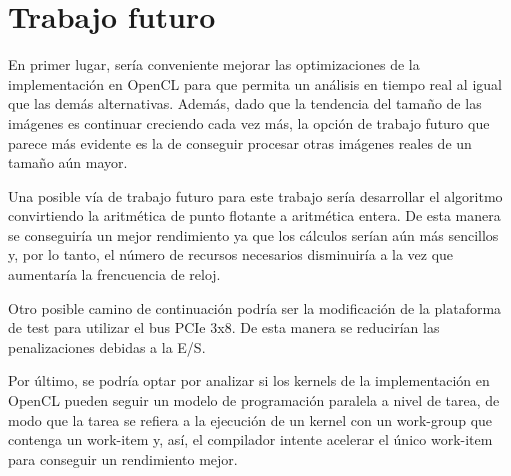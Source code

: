 
\section{Trabajo futuro}

En primer lugar, sería conveniente mejorar las optimizaciones de la implementación en OpenCL para que permita un análisis en tiempo real al igual que las demás alternativas. Además, dado que la tendencia del tamaño de las imágenes es continuar creciendo cada vez más, la opción de trabajo futuro que parece más evidente es la de conseguir procesar otras imágenes reales de un tamaño aún mayor.

Una posible vía de trabajo futuro para este trabajo sería desarrollar el algoritmo convirtiendo la aritmética de punto flotante a aritmética entera. De esta manera se conseguiría un mejor rendimiento ya que los cálculos serían aún más sencillos y, por lo tanto, el número de recursos necesarios disminuiría a la vez que aumentaría la frencuencia de reloj.

Otro posible camino de continuación podría ser la modificación de la plataforma de test para utilizar el bus PCIe 3x8. De esta manera se reducirían las penalizaciones debidas a la E/S.

Por último, se podría optar por analizar si los kernels de la implementación en OpenCL pueden seguir un modelo de programación paralela a nivel de tarea, de modo que la tarea se refiera a la ejecución de un kernel con un work-group que contenga un work-item y, así, el compilador intente acelerar el único work-item para conseguir un rendimiento mejor.

